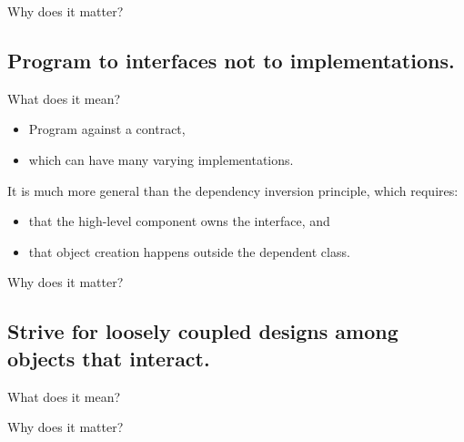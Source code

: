 \documentclass{beamer}
\begin{document}
\begin{frame}{Why does it matter?}
\end{frame}

\begin{frame}{}
    
\end{frame}

\begin{frame}{}
    
\end{frame}

\subsection{Program to interfaces not to implementations.}

\begin{frame}{What does it mean?}
    \begin{itemize}
        \item Program against a contract, 
        \item which can have many varying implementations.
    \end{itemize}
    \par It is much more general than the dependency inversion principle, which requires:
    \begin{itemize}
        \item that the high-level component owns the interface, and
        \item that object creation happens outside the dependent class.
    \end{itemize}
\end{frame}

\begin{frame}{Why does it matter?}
\end{frame}

\begin{frame}{}
    
\end{frame}

\begin{frame}{}
    
\end{frame}

\subsection{Strive for loosely coupled designs among objects that interact.}

\begin{frame}{What does it mean?}
\end{frame}

\begin{frame}{Why does it matter?}
\end{frame}

\begin{frame}{}
    
\end{frame}

\begin{frame}{}
    
\end{frame}
\end{document}
